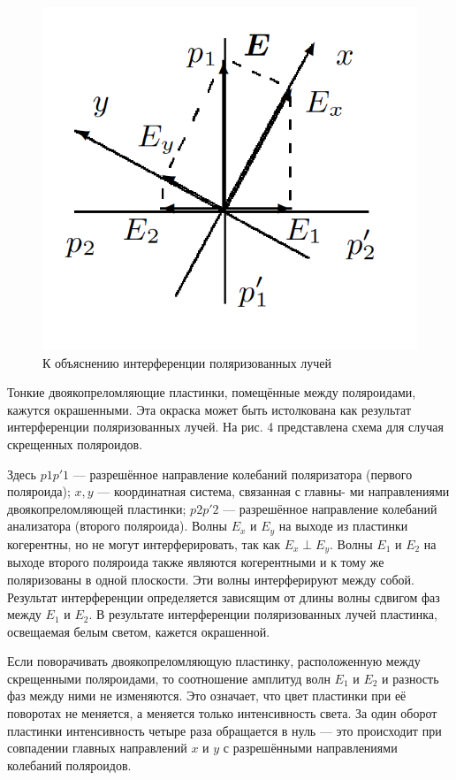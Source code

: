 \documentclass[a4paper, 12pt]{article}%
\begin{document}
	\begin{figure}
		\includegraphics[width=\linewidth]{4}
		\caption{К объяснению интерференции
			поляризованных лучей}
		\label{ris 4}
	\end{figure}
	
	
	Тонкие двоякопреломляющие пластинки, помещённые между поляроидами, кажутся окрашенными. Эта окраска может быть истолкована как результат интерференции поляризованных лучей. На рис. 4 представлена схема для
	случая скрещенных поляроидов.
	
	Здесь $ p1p'1 $ --- разрешённое направление колебаний поляризатора
	(первого поляроида); $ x, y $ --- координатная система, связанная с главны-
	ми направлениями двоякопреломляющей пластинки; $ p2p'2 $ --- разрешённое направление колебаний анализатора (второго поляроида). Волны
	$ E_x  $ и $ E_y $ на выходе из пластинки когерентны, но не могут интерферировать, так как $ E_x \perp  E_y $. Волны $ E_1 $ и $ E_2 $ на выходе второго поляроида
	также являются когерентными и к тому же поляризованы в одной плоскости. Эти волны интерферируют между собой. Результат интерференции определяется зависящим от длины волны сдвигом фаз между $ E_1 $
	и $ E_2 $. В результате интерференции поляризованных лучей пластинка, освещаемая белым светом, кажется окрашенной.
	
	Если поворачивать двоякопреломляющую пластинку, расположенную между
	скрещенными поляроидами, то соотношение амплитуд волн $ E_1 $ и $ E_2 $ и разность фаз между ними не изменяются. Это означает, что цвет пластинки при её поворотах не меняется, а меняется только интенсивность света. За один оборот пластинки интенсивность четыре раза обращается в нуль --- это происходит при совпадении главных направлений
	$ x $ и $ y $ с разрешёнными направлениями колебаний поляроидов.
	
\end{document}
